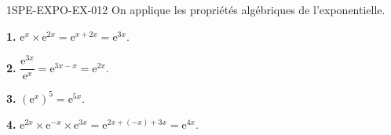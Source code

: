 \begin{corrige}{1SPE-EXPO-EX-012}
On applique les propriétés algébriques de l'exponentielle.

\textbf{1.} $\mathrm{e}^x \times \mathrm{e}^{2x} = \mathrm{e}^{x+2x} = \mathrm{e}^{3x}$.

\textbf{2.} $\dfrac{\mathrm{e}^{3x}}{\mathrm{e}^x} = \mathrm{e}^{3x-x} = \mathrm{e}^{2x}$.

\textbf{3.} $\left(\mathrm{e}^x\right)^5 = \mathrm{e}^{5x}$.

\textbf{4.} $\mathrm{e}^{2x} \times \mathrm{e}^{-x} \times \mathrm{e}^{3x} = \mathrm{e}^{2x+(-x)+3x} = \mathrm{e}^{4x}$.
\end{corrige}
